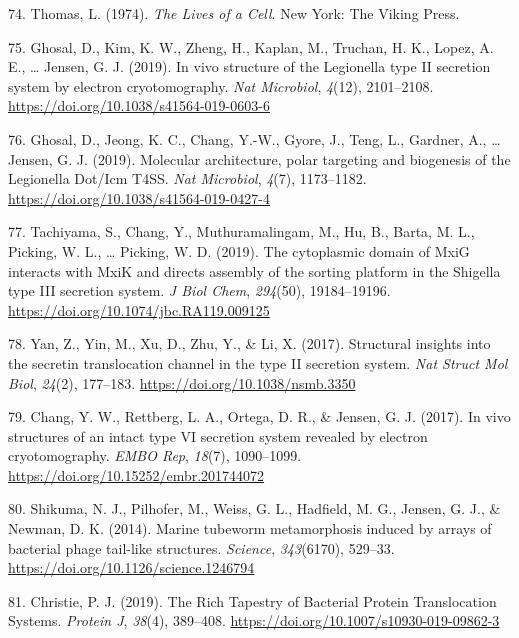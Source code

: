 \documentclass[]{tufte-book}
\begin{document}
\leavevmode\hypertarget{ref-thomas1974}{}%
74. Thomas, L. (1974). \emph{The Lives of a Cell}. New York: The Viking Press.

\leavevmode\hypertarget{ref-ghosal2019}{}%
75. Ghosal, D., Kim, K. W., Zheng, H., Kaplan, M., Truchan, H. K., Lopez, A. E., \ldots{} Jensen, G. J. (2019). In vivo structure of the Legionella type II secretion system by electron cryotomography. \emph{Nat Microbiol}, \emph{4}(12), 2101--2108. \url{https://doi.org/10.1038/s41564-019-0603-6}

\leavevmode\hypertarget{ref-ghosal2019a}{}%
76. Ghosal, D., Jeong, K. C., Chang, Y.-W., Gyore, J., Teng, L., Gardner, A., \ldots{} Jensen, G. J. (2019). Molecular architecture, polar targeting and biogenesis of the Legionella Dot/Icm T4SS. \emph{Nat Microbiol}, \emph{4}(7), 1173--1182. \url{https://doi.org/10.1038/s41564-019-0427-4}

\leavevmode\hypertarget{ref-tachiyama2019}{}%
77. Tachiyama, S., Chang, Y., Muthuramalingam, M., Hu, B., Barta, M. L., Picking, W. L., \ldots{} Picking, W. D. (2019). The cytoplasmic domain of MxiG interacts with MxiK and directs assembly of the sorting platform in the Shigella type III secretion system. \emph{J Biol Chem}, \emph{294}(50), 19184--19196. \url{https://doi.org/10.1074/jbc.RA119.009125}

\leavevmode\hypertarget{ref-yan2017a}{}%
78. Yan, Z., Yin, M., Xu, D., Zhu, Y., \& Li, X. (2017). Structural insights into the secretin translocation channel in the type II secretion system. \emph{Nat Struct Mol Biol}, \emph{24}(2), 177--183. \url{https://doi.org/10.1038/nsmb.3350}

\leavevmode\hypertarget{ref-chang2017}{}%
79. Chang, Y. W., Rettberg, L. A., Ortega, D. R., \& Jensen, G. J. (2017). In vivo structures of an intact type VI secretion system revealed by electron cryotomography. \emph{EMBO Rep}, \emph{18}(7), 1090--1099. \url{https://doi.org/10.15252/embr.201744072}

\leavevmode\hypertarget{ref-shikuma2014}{}%
80. Shikuma, N. J., Pilhofer, M., Weiss, G. L., Hadfield, M. G., Jensen, G. J., \& Newman, D. K. (2014). Marine tubeworm metamorphosis induced by arrays of bacterial phage tail-like structures. \emph{Science}, \emph{343}(6170), 529--33. \url{https://doi.org/10.1126/science.1246794}

\leavevmode\hypertarget{ref-christie2019}{}%
81. Christie, P. J. (2019). The Rich Tapestry of Bacterial Protein Translocation Systems. \emph{Protein J}, \emph{38}(4), 389--408. \url{https://doi.org/10.1007/s10930-019-09862-3}
\end{document}

